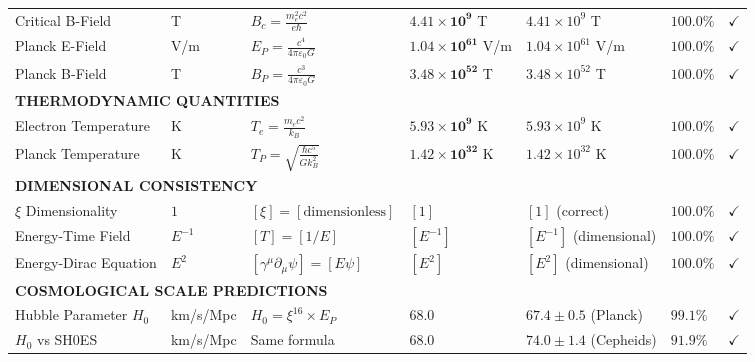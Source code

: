 \documentclass[12pt,a4paper]{article}
\newcommand{\xipar}{\xi}
\newcommand{\checked}{\checkmark}
\begin{document}
\begin{landscape}
\begin{longtable}{p{5.8cm}p{2cm}p{4.2cm}p{3.8cm}p{3.8cm}p{2.0cm}p{1cm}}
			Critical B-Field & T & $B_c = \frac{m_e^2 c^2}{e\hbar}$ & $\mathbf{4.41 \times 10^{9}}$ T & $4.41 \times 10^{9}$ T & $\mathbf{100.0\%}$ & $\checked$ \\
			
			Planck E-Field & V/m & $E_P = \frac{c^4}{4\pi\varepsilon_0 G}$ & $\mathbf{1.04 \times 10^{61}}$ V/m & $1.04 \times 10^{61}$ V/m & $\mathbf{100.0\%}$ & $\checked$ \\
			
			Planck B-Field & T & $B_P = \frac{c^3}{4\pi\varepsilon_0 G}$ & $\mathbf{3.48 \times 10^{52}}$ T & $3.48 \times 10^{52}$ T & $\mathbf{100.0\%}$ & $\checked$ \\
			
			\multicolumn{7}{l}{\textbf{THERMODYNAMIC QUANTITIES}} \\
			\midrule
			Electron Temperature & K & $T_e = \frac{m_e c^2}{k_B}$ & $\mathbf{5.93 \times 10^{9}}$ K & $5.93 \times 10^{9}$ K & $\mathbf{100.0\%}$ & $\checked$ \\
			
			Planck Temperature & K & $T_P = \sqrt{\frac{\hbar c^5}{G k_B^2}}$ & $\mathbf{1.42 \times 10^{32}}$ K & $1.42 \times 10^{32}$ K & $\mathbf{100.0\%}$ & $\checked$ \\
			
			\multicolumn{7}{l}{\textbf{DIMENSIONAL CONSISTENCY}} \\
			\midrule
			$\xipar$ Dimensionality & $1$ & $[\xipar] = [\text{dimensionless}]$ & $[1]$ & $[1]$ (correct) & $\mathbf{100.0\%}$ & $\checked$ \\
			
			Energy-Time Field & $E^{-1}$ & $[T] = [1/E]$ & $[E^{-1}]$ & $[E^{-1}]$ (dimensional) & $\mathbf{100.0\%}$ & $\checked$ \\
			
			Energy-Dirac Equation & $E^2$ & $[\gamma^{\mu}\partial_{\mu}\psi] = [E\psi]$ & $[E^2]$ & $[E^2]$ (dimensional) & $\mathbf{100.0\%}$ & $\checked$ \\
			
			\multicolumn{7}{l}{\textbf{COSMOLOGICAL SCALE PREDICTIONS}} \\
			\midrule
			Hubble Parameter $H_0$ & km/s/Mpc & $H_0 = \xi^{16} \times E_P$ & $\mathbf{68.0}$ & $67.4 \pm 0.5$ (Planck) & $\mathbf{99.1\%}$ & $\checked$ \\
			
			$H_0$ vs SH0ES & km/s/Mpc & Same formula & $\mathbf{68.0}$ & $74.0 \pm 1.4$ (Cepheids) & $\mathbf{91.9\%}$ & $\checked$ \\
			

\end{longtable}
\end{landscape}
\end{document}
